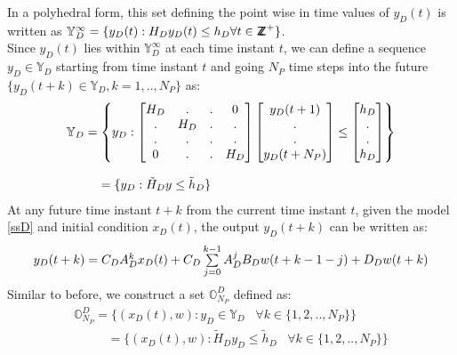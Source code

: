 \documentclass[letterpaper, 10 pt, conference]{ieeeconf}  %
\newcommand*{\ZZ}{%
	\textsf{Z\kern-1ex Z}%
}
\begin{document}
In a polyhedral form, this set defining the point wise in time values of $y_D(t)$ is written as $\mathbb{Y}_D^{\infty} = \{y_D(t):H_Dy_D(t) \leq h_D \forall t \in \ZZ^+\}$. \\
 Since $y_D(t)$ lies within $\mathbb{Y}_D^{\infty}$ at each time instant $t$, we can define a sequence $y_D \in \mathbb{Y}_D$ starting from time instant $t$ and going $N_P$ time steps into the future $\{y_D(t+k)\in\mathbb{Y}_D,k=1,..,N_P\}$ as:
 \begin{equation}
 \small
 \begin{matrix}
 \mathbb{Y}_D=\begin{Bmatrix}y_D:
 \begin{bmatrix}
 H_D & . & . & 0 \\
 . & H_D & . & .\\
 . & . & . & . \\
 0 & . & . & H_D
 \end{bmatrix}
 \begin{bmatrix}
 y_D(t+1) \\ . \\ . \\ y_D(t+N_P)
 \end{bmatrix}
 \leq \begin{bmatrix}
 h_D \\ . \\ . \\  h_D
 \end{bmatrix}
 \end{Bmatrix} 
 \\ \\
 \hspace{-120pt}
 = 
 \{ y_D: \tilde{H}_D y \leq \tilde{h}_D \}
 \end{matrix}
 \label{YD_set}
 \end{equation} 
At any future time instant $t+k$ from the current time instant $t$, given the model \eqref{ssD} and initial condition $x_D(t)$, the output $y_D(t+k)$ can be written as:
\begin{equation}
\small
\begin{matrix}
y_D(t+k)=C_DA_D^{k}x_D(t)+ C_D\sum\limits_{j=0}^{k-1}A_D^jB_Dw(t+k-1-j)+D_Dw(t+k) \\
\end{matrix}
\label{expanded_xD}
\end{equation}
Similar to before, we construct a set $\mathbb{O}^D_{N_P}$ defined as:
  \begin{equation}
  \begin{matrix}
  \mathbb{O}^D_{N_P} = \{(x_D(t),w):y_D\in \mathbb{Y}_D \hspace{10pt} \forall k \in \{1,2,..,N_P\} \}  \\
    \hspace{32pt} = \{(x_D(t),w):\tilde{H}_Dy_D \leq \tilde{h}_D \hspace{10pt} \forall k \in \{1,2,..,N_P\} \} 
  \end{matrix}
  \label{O_D_form}
  \end{equation}
\end{document}
